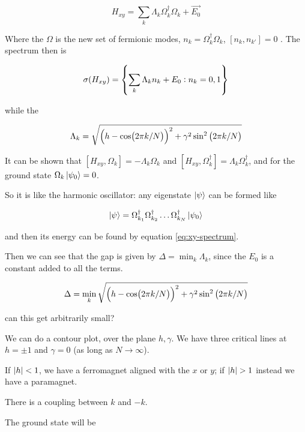 \documentclass[main.tex]{subfiles}
\begin{document}
\begin{equation}
    H _{xy} = \sum _{k}  \Lambda_k \Omega_k ^\dag \Omega_k + \vec{E_0}
\end{equation}

Where the \(\Omega\) is the new set of fermionic modes, \(n_k = \Omega_k ^\dag \Omega_k\), \([n_ k, n_{k'}]=0\) . The spectrum then is

\begin{equation} \label{eq:xy-spectrum}
    \sigma(H _{xy} ) = \qty{\sum _{k}  \Lambda_k n_k + E_0 :  n_k = 0, 1 }
\end{equation}

while the

\begin{equation}
    \Lambda_k = \sqrt{\qty(h - \cos(2 \pi k /N))^2 + \gamma^2 \sin^2\qty(2 \pi k /N) }
\end{equation}

It can be shown that \([H _{xy}, \Omega_k ] = - \Lambda_k \Omega_k\) and  \([H _{xy}, \Omega_k^\dag ] = \Lambda_k \Omega_k ^\dag\), and for the ground state \(\Omega_k \ket{\psi_0} = 0 \).

So it is like the harmonic oscillator: any eigenstate \(\ket{\psi } \) can be formed like

\begin{equation}
    \ket{\psi} = \Omega_{k_1}^\dag \Omega_{k_2}^\dag \dots \Omega_{k_N}^\dag \ket{\psi_0}
\end{equation}

and then its energy can be found by equation \eqref{eq:xy-spectrum}.

Then we can see that the gap is given by \(\Delta = \min_k \Lambda_k\), since the \(E_0\) is a constant added to all the terms.

\begin{equation}
    \Delta = \min_k \sqrt{\qty(h - \cos(2 \pi k /N))^2 + \gamma^2 \sin^2\qty(2 \pi k /N) }
\end{equation}

can this get arbitrarily small?

We can do a contour plot, over the plane \(h, \gamma\). We have three critical lines at \(h = \pm 1\) and \(\gamma = 0\) (as long as \(N \rightarrow \infty\)).

If \(\abs{h} <1\), we have a ferromagnet aligned with the \(x\) or \(y\); if \(\abs{h}>1\) instead we have a paramagnet.

There is a coupling between \(k\) and \(-k\).

The ground state will be
\end{document}
